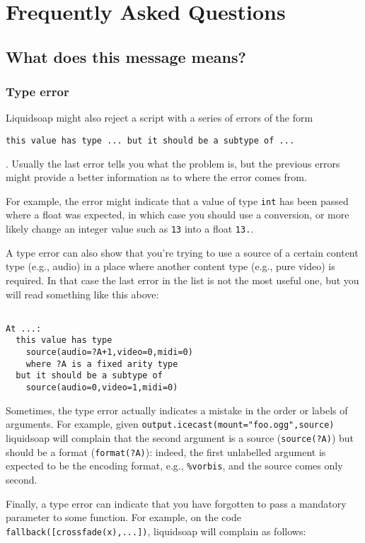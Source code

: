 \section{Frequently Asked Questions}
\subsection{What does this message means?}
\subsubsection{Type error}
Liquidsoap might also reject a script with a series of errors of the form \begin{verbatim}
this value has type ... but it should be a subtype of ...
\end{verbatim}
. Usually the last error tells you what the problem is, but the previous errors might provide a better information as to where the error comes from.

For example, the error might indicate that a value of type \verb+int+ has been passed where a float was expected, in which case you should use a conversion, or more likely change an integer value such as \verb+13+ into a float \verb+13.+.

A type error can also show that you're trying to use a source of a certain content type (e.g., audio) in a place where another content type (e.g., pure video) is required. In that case the last error in the list is not the most useful one, but you will read something like this above:

\begin{verbatim}

At ...:
  this value has type
    source(audio=?A+1,video=0,midi=0)
    where ?A is a fixed arity type
  but it should be a subtype of
    source(audio=0,video=1,midi=0)
\end{verbatim}
Sometimes, the type error actually indicates a mistake in the order or labels of arguments. For example, given \verb+output.icecast(mount="foo.ogg",source)+ liquidsoap will complain that the second argument is a source (\verb+source(?A)+) but should be a format (\verb+format(?A)+): indeed, the first unlabelled argument is expected to be the encoding format, e.g., \verb+%vorbis+, and the source comes only second.

Finally, a type error can indicate that you have forgotten to pass a mandatory parameter to some function. For example, on the code \verb+fallback([crossfade(x),...])+, liquidsoap will complain as follows:

